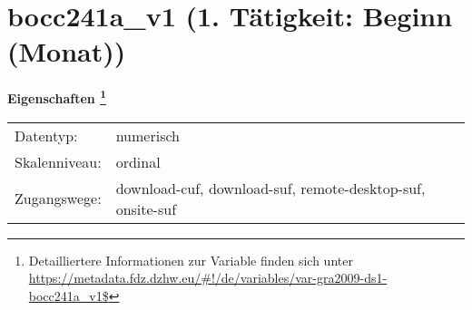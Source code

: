 
    \setcounter{footnote}{0}

    \vspace*{-1.8cm}
	\section{bocc241a\_v1 (1. Tätigkeit: Beginn (Monat))}
	\label{section:bocc241a_v1}



    \vspace*{0.5cm}
    \noindent\textbf{Eigenschaften
	\footnote{Detailliertere Informationen zur Variable finden sich unter
		\url{https://metadata.fdz.dzhw.eu/\#!/de/variables/var-gra2009-ds1-bocc241a_v1$}}}\\
	\begin{tabularx}{\hsize}{@{}lX}
	Datentyp: & numerisch \\
	Skalenniveau: & ordinal \\
	Zugangswege: &
	  download-cuf, 
	  download-suf, 
	  remote-desktop-suf, 
	  onsite-suf
 \\
    \end{tabularx}



